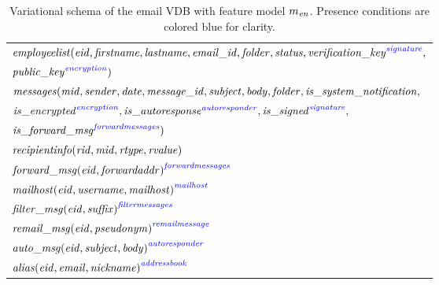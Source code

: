 \begin{table}
\caption[short caption]{Variational schema of the email VDB with feature model 
\ensuremath{\fModel_\enron}. 
Presence conditions are colored blue for clarity.
}
\label{tab:enron-vsch}
\centering
\small
\begin{tabular}{| l |}
\hline
$\employees(\eid,\fname,\lname,\emailid,\folder,\status,
 \annot[\fsignature]{\verificationkey},$\\
\hspace{60pt} $  \annot[\fencryption]{\publickey})$ \\
$\messages(\midatt, \sender, \dateatt, \messageid, \subject, \body, \folder,
  \issystemnotification,$\\
\hspace{44pt}  $  \annot[\fencryption]{\isencrypted},
\annot[\fautoresponder]{\isautoresponse},\annot[\fsignature]{\issigned},$\\
\hspace{44pt} $  \annot[\fforwardmsg]{\isforwardmsg})$\\
$\recipientinfo(\rid, \midatt, \rtype, \rvalue)$ \\
${\forwardmsg(\eid, \forwardaddr)}^{\fforwardmsg}$ \\
${\mailhost(\eid, \username, \mailhost)}^{\fmailhost}$\\
${\filtermsg(\eid, \suffix)}^{\ffiltermsg}$\\
${\remailmsg(\eid, \pseudonym)}^{\fremailmsg}$\\
${\automsg(\eid, \subject, \body)}^{\fautoresponder}$\\
${\alias(\eid, \emailAtt, \nickname)}^{\faddressbook}$\\
\hline
\end{tabular}
\end{table}

